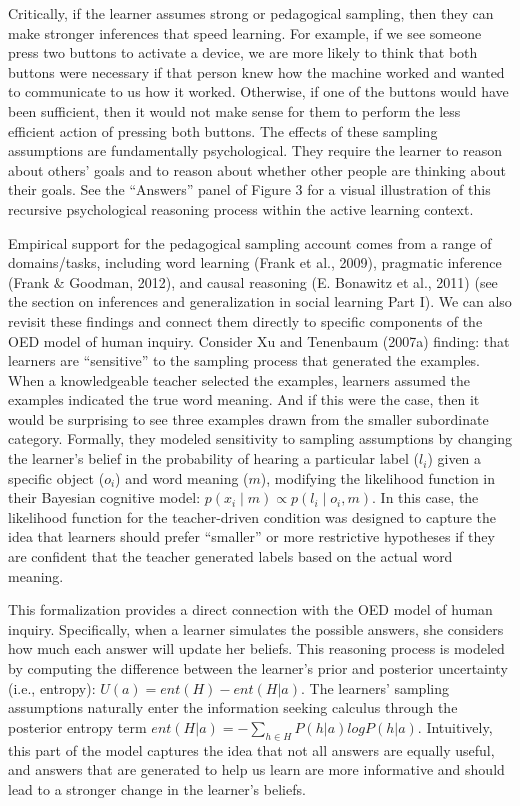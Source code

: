 \documentclass[english,floatsintext,man]{apa6}
\theoremstyle{definition}
\theoremstyle{definition}
\theoremstyle{definition}
\theoremstyle{remark}
\begin{document}
\noindent
Critically, if the learner assumes strong or pedagogical sampling, then
they can make stronger inferences that speed learning. For example, if
we see someone press two buttons to activate a device, we are more
likely to think that both buttons were necessary if that person knew how
the machine worked and wanted to communicate to us how it worked.
Otherwise, if one of the buttons would have been sufficient, then it
would not make sense for them to perform the less efficient action of
pressing both buttons. The effects of these sampling assumptions are
fundamentally psychological. They require the learner to reason about
others' goals and to reason about whether other people are thinking
about their goals. See the \enquote{Answers} panel of Figure 3 for a
visual illustration of this recursive psychological reasoning process
within the active learning context.

Empirical support for the pedagogical sampling account comes from a
range of domains/tasks, including word learning (Frank et al., 2009),
pragmatic inference (Frank \& Goodman, 2012), and causal reasoning (E.
Bonawitz et al., 2011) (see the section on inferences and generalization
in social learning Part I). We can also revisit these findings and
connect them directly to specific components of the OED model of human
inquiry. Consider Xu and Tenenbaum (2007a) finding: that learners are
\enquote{sensitive} to the sampling process that generated the examples.
When a knowledgeable teacher selected the examples, learners assumed the
examples indicated the true word meaning. And if this were the case,
then it would be surprising to see three examples drawn from the smaller
subordinate category. Formally, they modeled sensitivity to sampling
assumptions by changing the learner's belief in the probability of
hearing a particular label (\(l_i\)) given a specific object (\(o_i\))
and word meaning (\(m\)), modifying the likelihood function in their
Bayesian cognitive model: \(p(x_i \mid m) \propto p(l_i \mid o_i, m)\).
In this case, the likelihood function for the teacher-driven condition
was designed to capture the idea that learners should prefer
\enquote{smaller} or more restrictive hypotheses if they are confident
that the teacher generated labels based on the actual word meaning.

This formalization provides a direct connection with the OED model of
human inquiry. Specifically, when a learner simulates the possible
answers, she considers how much each answer will update her beliefs.
This reasoning process is modeled by computing the difference between
the learner's prior and posterior uncertainty (i.e., entropy):
\(U(a) = ent(H) - ent(H|a)\). The learners' sampling assumptions
naturally enter the information seeking calculus through the posterior
entropy term \(ent(H|a) = -\sum_{h\in H}{P(h|a)logP(h|a)}\).
Intuitively, this part of the model captures the idea that not all
answers are equally useful, and answers that are generated to help us
learn are more informative and should lead to a stronger change in the
learner's beliefs.
\end{document}
